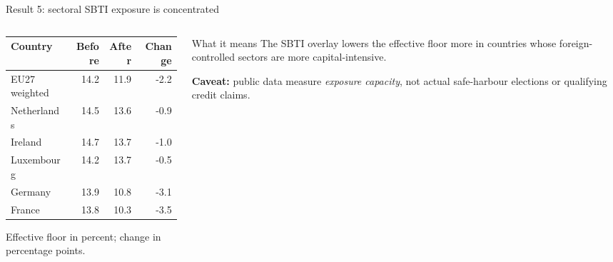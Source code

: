 \documentclass[aspectratio=169, 11pt]{beamer}
\newcommand{\emphbx}[1]{\textcolor{Bordeaux}{\textbf{#1}}}
\begin{document}
\begin{frame}{Result 5: sectoral SBTI exposure is concentrated}
\begin{columns}[T]
\begin{column}{0.52\textwidth}
\begin{center}
\scriptsize
\begin{tabular}{@{}lrrr@{}}
  \toprule
  Country & Before & After & Change \\
  \midrule
  EU27 weighted & 14.2 & 11.9 & -2.2 \\
  Netherlands & 14.5 & 13.6 & -0.9 \\
  Ireland & 14.7 & 13.7 & -1.0 \\
  Luxembourg & 14.2 & 13.7 & -0.5 \\
  Germany & 13.9 & 10.8 & -3.1 \\
  France & 13.8 & 10.3 & -3.5 \\
  \bottomrule
\end{tabular}

\vspace{0.2em}
\tiny Effective floor in percent; change in percentage points.
\end{center}
\end{column}
\begin{column}{0.44\textwidth}
\begin{exampleblock}{What it means}
  The SBTI overlay lowers the effective floor more in countries whose foreign-controlled sectors are more capital-intensive.
\end{exampleblock}

\vspace{0.35em}
\small
\emphbx{Caveat:} public data measure \emph{exposure capacity}, not actual safe-harbour elections or qualifying credit claims.
\end{column}
\end{columns}
\end{frame}
\end{document}
